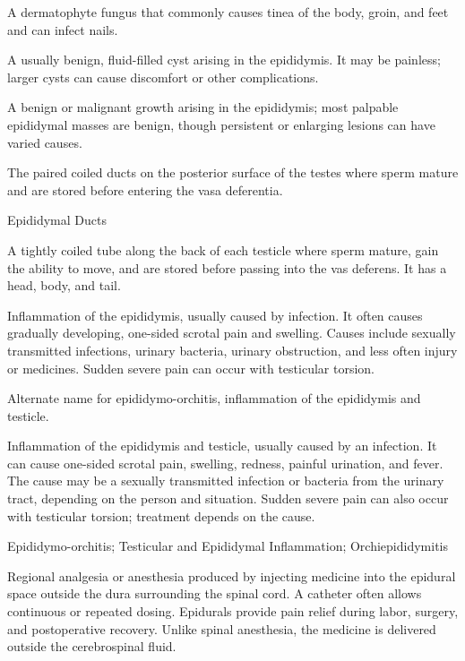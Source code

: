  A dermatophyte fungus that commonly causes tinea of the body, groin, and feet and can infect nails.

 A usually benign, fluid-filled cyst arising in the epididymis. It may be painless; larger cysts can cause discomfort or other complications.

 A benign or malignant growth arising in the epididymis; most palpable epididymal masses are benign, though persistent or enlarging lesions can have varied causes.

 The paired coiled ducts on the posterior surface of the testes where sperm mature and are stored before entering the vasa deferentia.

\synonyms
Epididymal Ducts

 A tightly coiled tube along the back of each testicle where sperm mature, gain the ability to move, and are stored before passing into the vas deferens. It has a head, body, and tail.

 Inflammation of the epididymis, usually caused by infection. It
often causes gradually developing, one-sided scrotal pain and swelling. Causes include
sexually transmitted infections, urinary bacteria, urinary obstruction, and less often
injury or medicines. Sudden severe pain can occur with testicular
torsion.

 Alternate name for epididymo-orchitis, inflammation of the epididymis and testicle.

 Inflammation of the epididymis and testicle, usually caused by an infection. It can cause one-sided scrotal pain, swelling, redness, painful urination, and fever. The cause may be a sexually transmitted infection or bacteria from the urinary tract, depending on the person and situation. Sudden severe pain can also occur with testicular torsion; treatment depends on the cause.

\synonyms
Epididymo-orchitis; Testicular and Epididymal Inflammation; Orchiepididymitis

 Regional analgesia or anesthesia produced by injecting medicine into the epidural space outside the dura surrounding the spinal cord.
A catheter often allows continuous or repeated dosing. Epidurals provide pain
relief during labor, surgery, and postoperative recovery. Unlike spinal
anesthesia, the medicine is delivered outside the cerebrospinal fluid.

